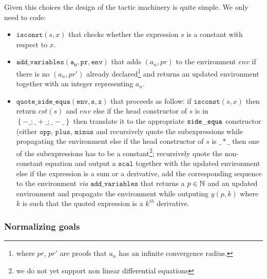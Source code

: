 \documentclass{article}
\begin{document}
Given this choices the design of the tactic machinery is quite simple. We only
need to code:
\begin{itemize}
\item{$\mathtt{isconst}(s, x)$} that checks whether the expression $s$ is a constant
  with respect to $x$.

\item{$\mathtt{add\_variables(a_n, pr, env)}$} that adds $(a_n, pr)$ to the
  environment $env$ if there is no $(a_n, pr')$ already declared\footnote{where
  $pr$, $pr'$ are proofs that $a_n$ has an infinite convergence radius.}
  and returns an updated environment together with an integer representing $a_n$.

\item{$\mathtt{quote\_side\_equa(env, s, x)}$} that proceeds as follow:
  \subitem if $\mathtt{isconst}(s, x)$ then return $cst(s)$ and $env$
  \subitem else if the head constructor of $s$ is in $\left\lbrace -\_; \_+\_;
   \_-\_\right\rbrace$ then translate it to the appropriate $\operatorname{\mathtt{side\_equa}}$ constructor
   (either $\mathtt{opp}$, $\mathtt{plus}$, $\mathtt{minus}$ and recursively
   quote the subexpressions while propagating the environment
  \subitem else if the head constructor of $s$ is $\_*\_$ then one of the
   subexpressions has to be a constant\footnote{we do not yet support non linear
   differential equations}; recursively quote the non-constant equation and
   output a $\mathtt{scal}$ together with the updated environment
  \subitem else if the expression is a sum or a derivative, add the corresponding
   sequence to the environment \textit{via} $\mathtt{add\_variables}$ that returns
   a $p \in \mathbb{N}$ and an updated environment and propagate the environment while
   outputing $y(p,k)$ where $k$ is such that the quoted expression is a $k^{th}$
   derivative.
\end{itemize}

\subsubsection{Normalizing goals}
\end{document}
